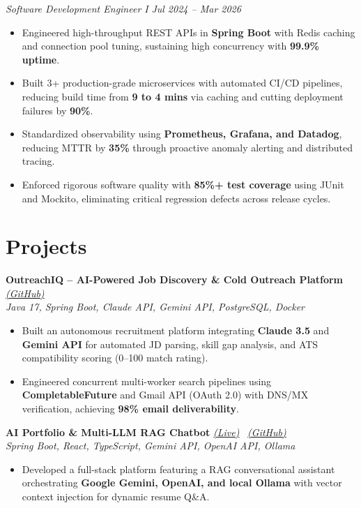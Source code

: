 \documentclass[a4paper,10pt]{article}
\begin{document}
\vspace{2pt}
\textit{Software Development Engineer I} \hfill \textit{Jul 2024 – Mar 2026}
\begin{itemize}[label={\textbullet}, itemsep=0.02em, leftmargin=*]
\item Engineered high-throughput REST APIs in \textbf{Spring Boot} with Redis caching and connection pool tuning, sustaining high concurrency with \textbf{99.9\% uptime}.
\item Built 3+ production-grade microservices with automated CI/CD pipelines, reducing build time from \textbf{9 to 4 mins} via caching and cutting deployment failures by \textbf{90\%}.
\item Standardized observability using \textbf{Prometheus, Grafana, and Datadog}, reducing MTTR by \textbf{35\%} through proactive anomaly alerting and distributed tracing.
\item Enforced rigorous software quality with \textbf{85\%+ test coverage} using JUnit and Mockito, eliminating critical regression defects across release cycles.
\end{itemize}

\vspace{1pt}
\section{Projects}

\vspace{1pt}
\textbf{OutreachIQ – AI-Powered Job Discovery \& Cold Outreach Platform} \href{https://github.com/parthnautiyal/email-automator-springboot}{\textit{(GitHub)}} \\
\textit{Java 17, Spring Boot, Claude API, Gemini API, PostgreSQL, Docker}
\begin{itemize}[label={\textbullet}, itemsep=0.02em, leftmargin=*]
\item Built an autonomous recruitment platform integrating \textbf{Claude 3.5} and \textbf{Gemini API} for automated JD parsing, skill gap analysis, and ATS compatibility scoring (0--100 match rating).
\item Engineered concurrent multi-worker search pipelines using \textbf{CompletableFuture} and Gmail API (OAuth 2.0) with DNS/MX verification, achieving \textbf{98\% email deliverability}.
\end{itemize}

\vspace{2pt}
\textbf{AI Portfolio \& Multi-LLM RAG Chatbot} \href{https://parthnautiyal.vercel.app/}{\textit{(Live)}} \textbar\ \href{https://github.com/parthnautiyal/portfolio}{\textit{(GitHub)}} \\
\textit{Spring Boot, React, TypeScript, Gemini API, OpenAI API, Ollama}
\begin{itemize}[label={\textbullet}, itemsep=0.02em, leftmargin=*]
\item Developed a full-stack platform featuring a RAG conversational assistant orchestrating \textbf{Google Gemini, OpenAI, and local Ollama} with vector context injection for dynamic resume Q\&A.
\end{itemize}
\end{document}
